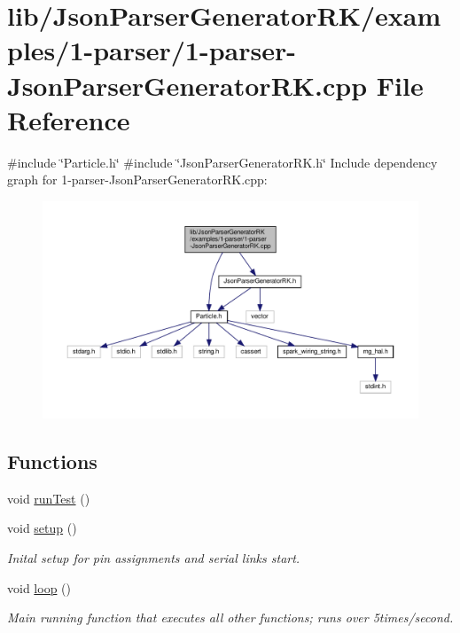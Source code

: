 \hypertarget{1-parser-_json_parser_generator_r_k_8cpp}{}\section{lib/\+Json\+Parser\+Generator\+R\+K/examples/1-\/parser/1-\/parser-\/\+Json\+Parser\+Generator\+RK.cpp File Reference}
\label{1-parser-_json_parser_generator_r_k_8cpp}
{\ttfamily \#include \char`\"{}Particle.\+h\char`\"{}}\newline
{\ttfamily \#include \char`\"{}Json\+Parser\+Generator\+R\+K.\+h\char`\"{}}\newline
Include dependency graph for 1-\/parser-\/\+Json\+Parser\+Generator\+RK.cpp\+:
\nopagebreak
\begin{figure}[H]
\begin{center}
\leavevmode
\includegraphics[width=350pt]{1-parser-_json_parser_generator_r_k_8cpp__incl}
\end{center}
\end{figure}
\subsection*{Functions}
\begin{DoxyCompactItemize}
\item 
void \hyperlink{1-parser-_json_parser_generator_r_k_8cpp_a822f652c6fc2f163c182a6e5fe922c23}{run\+Test} ()
\item 
void \hyperlink{1-parser-_json_parser_generator_r_k_8cpp_a4fc01d736fe50cf5b977f755b675f11d}{setup} ()
\begin{DoxyCompactList}\small\item\em Inital setup for pin assignments and serial links start. \end{DoxyCompactList}\item 
void \hyperlink{1-parser-_json_parser_generator_r_k_8cpp_afe461d27b9c48d5921c00d521181f12f}{loop} ()
\begin{DoxyCompactList}\small\item\em Main running function that executes all other functions; runs over 5times/second. \end{DoxyCompactList}\end{DoxyCompactItemize}
